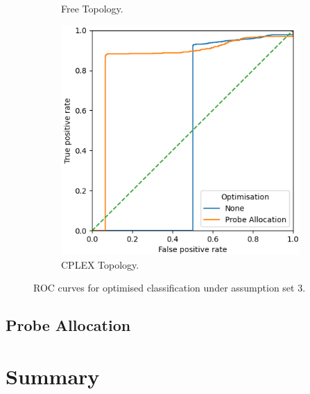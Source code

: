\begin{figure}
\begin{subfigure}{0.475\textwidth}
        \caption{Free Topology.}
    \end{subfigure}
    \begin{subfigure}{0.475\textwidth}
        \includegraphics[width=\textwidth]{figs/results/norway_ac3_opt.png}
        \caption{CPLEX Topology.}
    \end{subfigure}
    \caption{ROC curves for optimised classification under assumption set 3.}
    \label{fig:RprobeoptA3ROCcurves}
\end{figure}

\subsection{Probe Allocation}
\label{ssec:Rprobeallocation}

\section{Summary}
